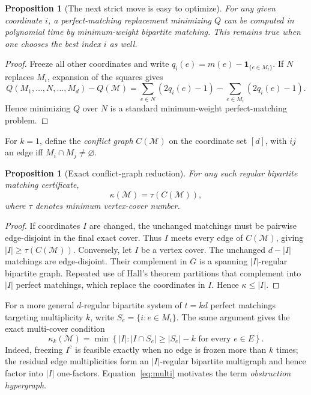 \documentclass[10pt]{article}
\newtheorem{proposition}[theorem]{Proposition}
\newcommand{\M}{\mathcal M}
\begin{document}
\begin{proposition}[The next strict move is easy to optimize]
For any given coordinate $i$, a perfect-matching replacement minimizing $Q$ can be computed in polynomial time by minimum-weight bipartite matching. This remains true when one chooses the best index $i$ as well.
\end{proposition}
\begin{proof}
Freeze all other coordinates and write $q_i(e)=m(e)-\mathbf 1_{\{e\in M_i\}}$. If $N$ replaces $M_i$, expansion of the squares gives
\[Q(M_1,\ldots,N,\ldots,M_d)-Q(\M)=\sum_{e\in N}(2q_i(e)-1)-\sum_{e\in M_i}(2q_i(e)-1).\]
Hence minimizing $Q$ over $N$ is a standard minimum-weight perfect-matching problem.\end{proof}

For $k=1$, define the \emph{conflict graph} $C(\M)$ on the coordinate set $[d]$, with $ij$ an edge iff $M_i\cap M_j\ne\varnothing$.
\begin{proposition}[Exact conflict-graph reduction]\label{prop:cover}
For any such regular bipartite matching certificate,
\[\kappa(\M)=\tau(C(\M)),\]
where $\tau$ denotes minimum vertex-cover number.
\end{proposition}
\begin{proof}
If coordinates $I$ are changed, the unchanged matchings must be pairwise edge-disjoint in the final exact cover. Thus $I$ meets every edge of $C(\M)$, giving $|I|\ge\tau(C(\M))$. Conversely, let $I$ be a vertex cover. The unchanged $d-|I|$ matchings are edge-disjoint. Their complement in $G$ is a spanning $|I|$-regular bipartite graph. Repeated use of Hall's theorem partitions that complement into $|I|$ perfect matchings, which replace the coordinates in $I$. Hence $\kappa\le|I|$.
\end{proof}

For a more general $d$-regular bipartite system of $t=kd$ perfect matchings targeting multiplicity $k$, write $S_e=\{i:e\in M_i\}$. The same argument gives the exact multi-cover condition
\begin{equation}\label{eq:multi}
\kappa_k(\M)=\min\left\{|I|:|I\cap S_e|\ge |S_e|-k\text{ for every }e\in E\right\}.
\end{equation}
Indeed, freezing $I^c$ is feasible exactly when no edge is frozen more than $k$ times; the residual edge multiplicities form an $|I|$-regular bipartite multigraph and hence factor into $|I|$ one-factors. Equation~\eqref{eq:multi} motivates the term \emph{obstruction hypergraph}.
\end{document}
